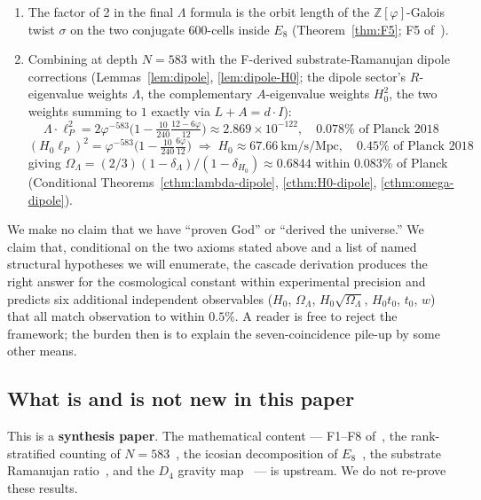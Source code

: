 \documentclass[11pt]{article}
\theoremstyle{plain}
\theoremstyle{definition}
\theoremstyle{remark}
\newcommand{\Zphi}{\mathbb{Z}[\varphi]}
\begin{document}
\begin{enumerate}[leftmargin=2em, label=(\arabic*)]
\item The factor of 2 in the final $\Lambda$ formula is the orbit length of the $\Zphi$-Galois twist $\sigma$ on the two conjugate 600-cells inside $E_8$ (Theorem~\ref{thm:F5}; F5 of~\citealp{SmartXXXVI}).

\item Combining at depth $N = 583$ with the F-derived substrate-Ramanujan dipole corrections (Lemmas~\ref{lem:dipole}, \ref{lem:dipole-H0}; the dipole sector's $R$-eigenvalue weights $\Lambda$, the complementary $A$-eigenvalue weights $H_0^2$, the two weights summing to $1$ exactly via $L + A = d \cdot I$):
\[
  \Lambda \cdot \ell_P^2 = 2 \varphi^{-583}\big(1 - \tfrac{10}{240}\tfrac{12-6\varphi}{12}\big) \approx 2.869 \times 10^{-122}, \quad \mathbf{0.078\%} \text{ of Planck 2018}
\]
\[
  (H_0 \ell_P)^2 = \varphi^{-583}\big(1 - \tfrac{10}{240}\tfrac{6\varphi}{12}\big) \;\Longrightarrow\; H_0 \approx 67.66~\text{km/s/Mpc}, \quad \mathbf{0.45\%} \text{ of Planck 2018}
\]
giving $\Omega_\Lambda = (2/3)(1-\delta_\Lambda)/(1-\delta_{H_0}) \approx 0.6844$ within $0.083\%$ of Planck (Conditional Theorems~\ref{cthm:lambda-dipole}, \ref{cthm:H0-dipole}, \ref{cthm:omega-dipole}).
\end{enumerate}

We make no claim that we have ``proven God'' or ``derived the universe.'' We claim that, conditional on the two axioms stated above and a list of named structural hypotheses we will enumerate, the cascade derivation produces the right answer for the cosmological constant within experimental precision and predicts six additional independent observables ($H_0$, $\Omega_\Lambda$, $H_0\sqrt{\Omega_\Lambda}$, $H_0 t_0$, $t_0$, $w$) that all match observation to within $0.5\%$. A reader is free to reject the framework; the burden then is to explain the seven-coincidence pile-up by some other means.

\subsection{What is and is not new in this paper}

This is a \textbf{synthesis paper}. The mathematical content --- F1--F8 of~\citet{SmartXXXVI}, the rank-stratified counting of $N = 583$~\citep{cascadeLambda}, the icosian decomposition of $E_8$~\citep{Elkies1990}, the substrate Ramanujan ratio~\citep{rhTwoSphere}, and the $D_4$ gravity map~\citep{cascadeGR} --- is upstream. We do not re-prove these results.
\end{document}
